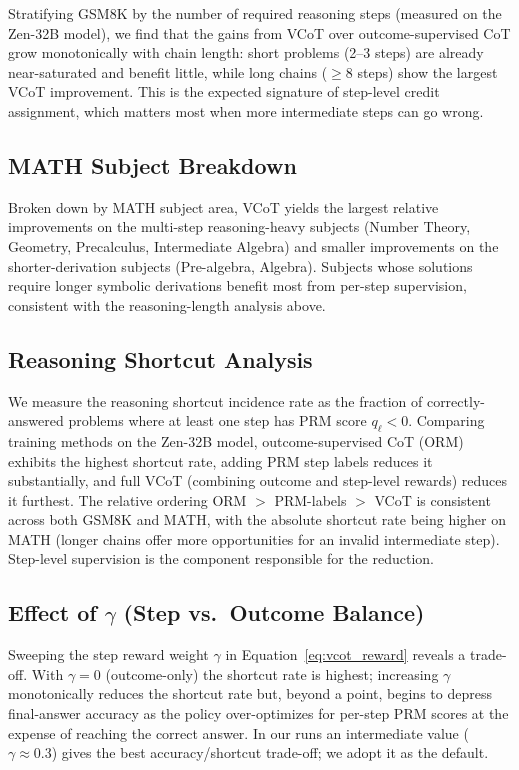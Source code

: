 \documentclass[11pt,a4paper]{article}
\begin{document}
Stratifying GSM8K by the number of required reasoning steps (measured on the Zen-32B
model), we find that the gains from VCoT over outcome-supervised CoT grow monotonically
with chain length: short problems (2--3 steps) are already near-saturated and benefit
little, while long chains ($\geq$8 steps) show the largest VCoT improvement. This is the
expected signature of step-level credit assignment, which matters most when more
intermediate steps can go wrong.

\subsection{MATH Subject Breakdown}

Broken down by MATH subject area, VCoT yields the largest relative improvements on the
multi-step reasoning-heavy subjects (Number Theory, Geometry, Precalculus, Intermediate
Algebra) and smaller improvements on the shorter-derivation subjects (Pre-algebra,
Algebra). Subjects whose solutions require longer symbolic derivations benefit most from
per-step supervision, consistent with the reasoning-length analysis above.

\subsection{Reasoning Shortcut Analysis}

We measure the reasoning shortcut incidence rate as the fraction of correctly-answered
problems where at least one step has PRM score $q_\ell < 0$. Comparing training methods
on the Zen-32B model, outcome-supervised CoT (ORM) exhibits the highest shortcut rate,
adding PRM step labels reduces it substantially, and full VCoT (combining outcome and
step-level rewards) reduces it furthest. The relative ordering
ORM $>$ PRM-labels $>$ VCoT is consistent across both GSM8K and MATH, with the absolute
shortcut rate being higher on MATH (longer chains offer more opportunities for an invalid
intermediate step). Step-level supervision is the component responsible for the reduction.

\subsection{Effect of $\gamma$ (Step vs.\ Outcome Balance)}

Sweeping the step reward weight $\gamma$ in Equation~\ref{eq:vcot_reward} reveals a
trade-off. With $\gamma = 0$ (outcome-only) the shortcut rate is highest; increasing
$\gamma$ monotonically reduces the shortcut rate but, beyond a point, begins to depress
final-answer accuracy as the policy over-optimizes for per-step PRM scores at the expense
of reaching the correct answer. In our runs an intermediate value ($\gamma \approx 0.3$)
gives the best accuracy/shortcut trade-off; we adopt it as the default.
\end{document}
